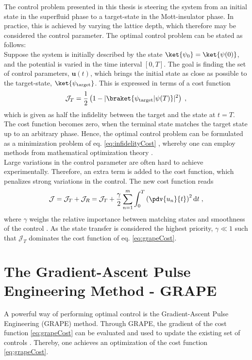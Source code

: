 The control problem presented in this thesis is steering the system from an initial state in the superfluid phase to a target-state in the Mott-insulator phase. In practice, this is achieved by varying the lattice depth, which therefore may be considered the control parameter. The optimal control problem can be stated as follows:\\
Suppose the system is initially described by the state $\ket{\psi_0} = \ket{\psi (0)}$, and the potential is varied in the time interval $[ 0 , T]$. The goal is finding the set of control parameters, $\boldsymbol{u}(t)$, which brings the initial state as close as possible to the target-state, $\ket{\psi_{\mathrm{target}}}$. This is expressed in terms of a cost function
\begin{equation}
	\mathcal{J}_T = \frac{1}{2} \left( 1-|\braket{\psi_{\mathrm{target}} | \psi (T)}|^2 \right) \; ,
	\label{eq:infidelityCost}
\end{equation}
which is given as half the infidelity between the target and the state at $t=T$. The cost function becomes zero, when the terminal state matches the target state up to an arbitrary phase. Hence, the optimal control problem can be formulated as a minimization problem of eq. \eqref{eq:infidelityCost} , whereby one can employ methods from mathematical optimization theory \cite{Jager2014}.\\
Large variations in the control parameter are often hard to achieve experimentally. Therefore, an extra term is added to the cost function, which penalizes strong variations in the control. The new cost function reads
\begin{equation}
	\mathcal{J} = \mathcal{J}_T + \mathcal{J}_R = \mathcal{J}_T + \frac{\gamma}{2} \sum_{n=1}^{m} \int_{0}^{T} \left( \pdv{u_n}{t} \right)^2 \mathrm{d}t \; ,
	\label{eq:grapeCost}
\end{equation}
where $\gamma$ weighs the relative importance between matching states and smoothness of the control \cite{Jager2014}. As the state transfer is considered the highest priority, $\gamma \ll 1$ such that $\mathcal{J}_T$ dominates the cost function of eq. \eqref{eq:grapeCost}.


\section{The Gradient-Ascent Pulse Engineering Method - GRAPE} \label{sec:GRAPE}
A powerful way of performing optimal control is the Gradient-Ascent Pulse Engineering (GRAPE) method. Through GRAPE, the gradient of the cost function \eqref{eq:grapeCost} can be evaluated and used to update the existing set of controls \cite{Khaneja2005}. Thereby, one achieves an optimization of the cost function \eqref{eq:grapeCost}.

